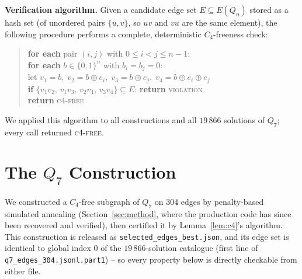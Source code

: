 \documentclass[12pt]{article}
\begin{document}
\noindent\textbf{Verification algorithm.}\quad
Given a candidate edge set $E\subseteq E(Q_n)$ stored as a hash set
(of unordered pairs $\{u,v\}$, so $uv$ and $vu$ are the same element),
the following procedure performs a complete, deterministic $C_4$-freeness check:
\begin{quote}\small
\textbf{for each} pair $(i,j)$ with $0\le i<j\le n-1$:\\
\quad\textbf{for each} $b\in\{0,1\}^n$ with $b_i=b_j=0$:\\
\quad\quad let $v_1=b,\;v_2=b\oplus e_i,\;v_3=b\oplus e_j,\;v_4=b\oplus e_i\oplus e_j$\\
\quad\quad \textbf{if} $\{v_1v_2,\,v_1v_3,\,v_2v_4,\,v_3v_4\}\subseteq E$:
  \textbf{return} \textsc{violation}\\
\textbf{return} \textsc{c4-free}
\end{quote}
We applied this algorithm to all constructions and all $19\,866$ solutions
of $Q_7$; every call returned \textsc{c4-free}.

\section{The \texorpdfstring{$Q_7$}{Q7} Construction}\label{sec:q7}

We constructed a $C_4$-free subgraph of $Q_7$ on 304 edges by
penalty-based simulated annealing (Section~\ref{sec:method}, where the
production code has since been recovered and verified),
then certified it by Lemma~\ref{lem:c4}'s algorithm. This construction
is released as \texttt{selected\_edges\_best.json}, and its edge set is
identical to global index $0$ of the $19\,866$-solution catalogue
(first line of \texttt{q7\_edges\_304.jsonl.part1}) --
so every property below is directly checkable from either file.
\end{document}
